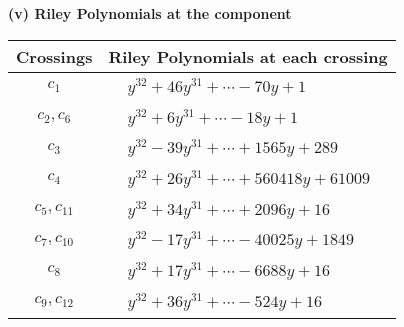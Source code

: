 \documentclass[1p]{elsarticle_modified}
\theoremstyle{definition}
\begin{document}
\newpage\renewcommand{\arraystretch}{1}
\flushleft \textbf{(v) Riley Polynomials at the component}\newline \\
\begin{tabular}{m{50pt}|m{274pt}}
Crossings & \hspace{64pt}Riley Polynomials at each crossing \\
\hline $$\begin{aligned}c_{1}\end{aligned}$$&$\begin{aligned}
&y^{32}+46 y^{31}+\cdots-70 y+1
\end{aligned}$\\
\hline $$\begin{aligned}c_{2},c_{6}\end{aligned}$$&$\begin{aligned}
&y^{32}+6 y^{31}+\cdots-18 y+1
\end{aligned}$\\
\hline $$\begin{aligned}c_{3}\end{aligned}$$&$\begin{aligned}
&y^{32}-39 y^{31}+\cdots+1565 y+289
\end{aligned}$\\
\hline $$\begin{aligned}c_{4}\end{aligned}$$&$\begin{aligned}
&y^{32}+26 y^{31}+\cdots+560418 y+61009
\end{aligned}$\\
\hline $$\begin{aligned}c_{5},c_{11}\end{aligned}$$&$\begin{aligned}
&y^{32}+34 y^{31}+\cdots+2096 y+16
\end{aligned}$\\
\hline $$\begin{aligned}c_{7},c_{10}\end{aligned}$$&$\begin{aligned}
&y^{32}-17 y^{31}+\cdots-40025 y+1849
\end{aligned}$\\
\hline $$\begin{aligned}c_{8}\end{aligned}$$&$\begin{aligned}
&y^{32}+17 y^{31}+\cdots-6688 y+16
\end{aligned}$\\
\hline $$\begin{aligned}c_{9},c_{12}\end{aligned}$$&$\begin{aligned}
&y^{32}+36 y^{31}+\cdots-524 y+16
\end{aligned}$\\
\hline
\end{tabular}\\~\\
\end{document}
